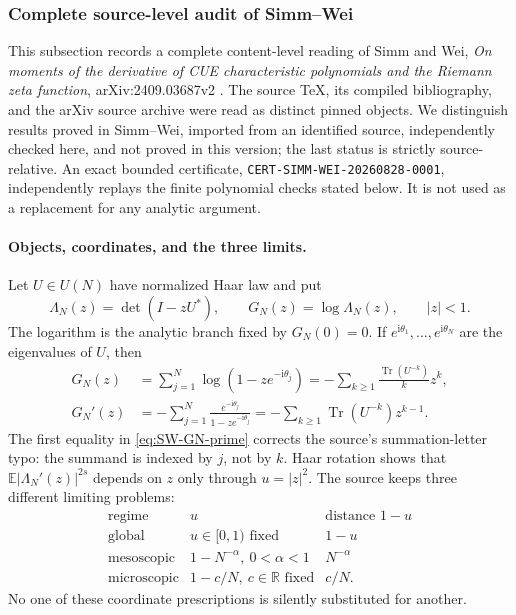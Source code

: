 \subsubsection{Complete source-level audit of Simm--Wei}
\label{sec:simm-wei-complete-audit}

This subsection records a complete content-level reading of Simm and Wei,
\emph{On moments of the derivative of CUE characteristic polynomials and the Riemann
zeta function}, arXiv:2409.03687v2 \cite{simmWei2026}.  The source TeX, its compiled
bibliography, and the arXiv source archive were read as distinct pinned objects.  We distinguish
results proved in Simm--Wei, imported from an identified source, independently checked here,
and not proved in this version; the last status is strictly source-relative.
An exact bounded certificate, \texttt{CERT-SIMM-WEI-20260828-0001}, independently replays
the finite polynomial checks stated below.  It is not used as a replacement for any analytic
argument.

\paragraph{Objects, coordinates, and the three limits.}
Let $U\in U(N)$ have normalized Haar law and put
\begin{equation}
 \Lambda_N(z)=\det(I-zU^*),\qquad
 G_N(z)=\log\Lambda_N(z),\qquad |z|<1.
 \label{eq:SW-objects}
\end{equation}
The logarithm is the analytic branch fixed by $G_N(0)=0$.  If
$e^{\mathrm i\theta_1},\ldots,e^{\mathrm i\theta_N}$ are the eigenvalues of $U$, then
\begin{align}
 G_N(z)&=\sum_{j=1}^{N}\log(1-ze^{-\mathrm i\theta_j})
       =-\sum_{k\geq1}\frac{\operatorname{Tr}(U^{-k})}{k}z^k,
 \label{eq:SW-GN}\\
 G_N'(z)&=-\sum_{j=1}^{N}\frac{e^{-\mathrm i\theta_j}}
                                  {1-ze^{-\mathrm i\theta_j}}
       =-\sum_{k\geq1}\operatorname{Tr}(U^{-k})z^{k-1}.
 \label{eq:SW-GN-prime}
\end{align}
The first equality in \eqref{eq:SW-GN-prime} corrects the source's summation-letter typo:
the summand is indexed by $j$, not by $k$.  Haar rotation shows that
$\mathbb E|\Lambda_N'(z)|^{2s}$ depends on $z$ only through $u=|z|^2$.  The source keeps
three different limiting problems:
\begin{equation}
 \begin{array}{c|c|c}
 \text{regime}&u&\text{distance }1-u\\ \hline
 \text{global}&u\in[0,1)\text{ fixed}&1-u\\
 \text{mesoscopic}&1-N^{-\alpha},\ 0<\alpha<1&N^{-\alpha}\\
 \text{microscopic}&1-c/N,\ c\in\mathbb R\text{ fixed}&c/N.
 \end{array}
 \label{eq:SW-three-regimes}
\end{equation}
No one of these coordinate prescriptions is silently substituted for another.

